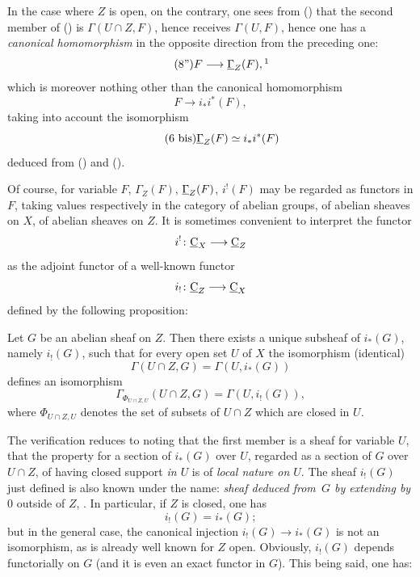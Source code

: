 In the case where $Z$ is open, on the contrary, one sees from
() that the second member of () is
$\Gamma(U\cap Z, F)$, hence receives $\Gamma(U, F)$, hence one has a
\textit{canonical homomorphism} in the opposite direction from the
preceding one:
\begin{equation*} \label{eq:I.8''} \tag{$8"$} {F\to \sheaf{\Gamma}_Z(F)},\nde{the original reference was (8).}
\end{equation*}
which is moreover nothing other than the canonical homomorphism
\[
F\to i_*i^*(F),
\]
taking into account the isomorphism
\begin{equation*} \label{eq:I.6bis} \tag{6 bis} {\underline{\Gamma}_Z(F)\simeq i_*i^*(F)}
\end{equation*}
deduced from () and ().

Of course, for variable $F$, $\Gamma_Z(F)$, $\underline{\Gamma}_Z(F)$,
$i^!(F)$ may be regarded as functors in $F$, taking values respectively
in the category of abelian groups, of abelian sheaves on $X$, of
abelian sheaves on $Z$. It is sometimes convenient to interpret the
functor
\[
i^!\colon \ccat_X \to \ccat_Z
\]
as the adjoint functor of a well-known functor
\[
i_!\colon \ccat_Z \to \ccat_X
\]
defined by the following proposition:

\begin{proposition} \label{I.1.2}
Let $G$ be an abelian sheaf on $Z$. Then there exists a unique
subsheaf of $i_*(G)$, namely $i_!(G)$, such that for every open set
$U$ of $X$ the isomorphism (identical)
\[
\Gamma(U\cap Z, G)= \Gamma(U, i_*(G))
\]
defines an isomorphism
\[
\Gamma_{\Phi_{U\cap Z, U}}(U\cap Z, G)=\Gamma(U, i_! (G)),
\]
where $\Phi_{U\cap Z, U}$ denotes the set of subsets of $U\cap Z$
which are closed in $U$.
\end{proposition}

The verification reduces to noting that the first member is a sheaf
for variable $U$, \ie that the property for a section of $i_*(G)$
over $U$, regarded as a section of $G$ over $U\cap Z$, of having
closed support \textit{in $U$} is of \textit{local nature on $U$}.
The sheaf $i_!(G)$ just defined is also known under the name:
\textit{sheaf deduced from~$G$ by extending by $0$} outside of $Z$,
\cf \cite{Godement}. In particular, if $Z$ is closed, one has
\begin{equation} \label{eq:I.9} {i_!(G)=i_*(G)};
\end{equation}
but in the general case, the canonical injection $i_!(G) \to i_*(G)$
is not an isomorphism, as is already well known for $Z$ open.
Obviously, $i_!(G)$ depends functorially on $G$ (and it is even an
exact functor in $G$). This being said, one has:

